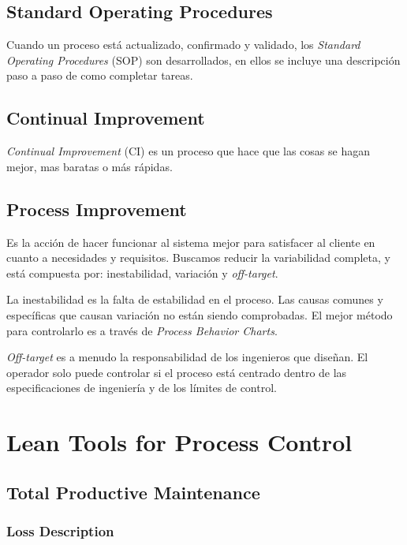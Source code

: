 \documentclass[]{article}
\begin{document}
\subsection{Standard Operating Procedures}

Cuando un proceso está actualizado, confirmado y validado, los \textit{Standard Operating Procedures} (SOP) son desarrollados, en ellos se incluye una descripción paso a paso de como completar tareas. 

\subsection{Continual Improvement}

\textit{Continual Improvement} (CI) es un proceso que hace que las cosas se hagan mejor, mas baratas o más rápidas. 

\subsection{Process Improvement}

Es la acción de hacer funcionar al sistema mejor para satisfacer al cliente en cuanto a necesidades y requisitos. Buscamos reducir la variabilidad completa, y está compuesta por: inestabilidad, variación y \textit{off-target}.

La inestabilidad es la falta de estabilidad en el proceso. Las causas comunes y específicas que causan variación no están siendo comprobadas. El mejor método para controlarlo es a través de \textit{Process Behavior Charts}.

\textit{Off-target} es a menudo la responsabilidad de los ingenieros que diseñan. El operador solo puede controlar si el proceso está centrado dentro de las especificaciones de ingeniería y de los límites de control.

\section{Lean Tools for Process Control}

\subsection{Total Productive Maintenance}

\subsubsection{Loss Description}
\end{document}

